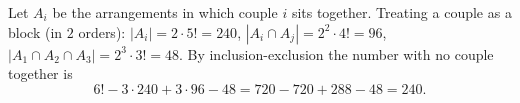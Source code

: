 Let $A_i$ be the arrangements in which couple $i$ sits together. Treating a couple as a block (in $2$ orders): $|A_i|=2\cdot5!=240$, $|A_i\cap A_j|=2^2\cdot4!=96$, $|A_1\cap A_2\cap A_3|=2^3\cdot3!=48$. By inclusion-exclusion the number with no couple together is
\[6!-3\cdot240+3\cdot96-48=720-720+288-48=\boxed{240}.\]
